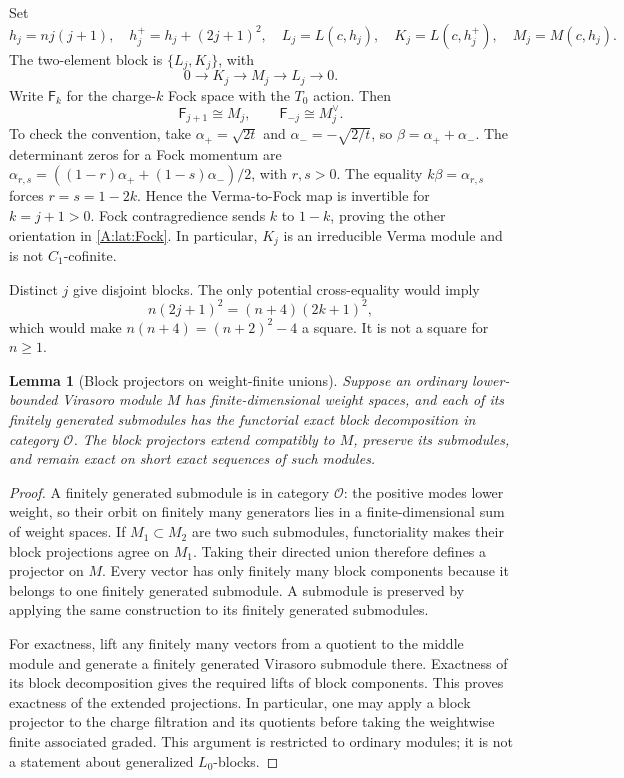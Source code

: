 \documentclass[11pt]{article}
\newtheorem{lemma}[theorem]{Lemma}
\numberwithin{equation}{section}
\begin{document}
Set
\[
 h_j=nj(j+1),\quad h_j^+=h_j+(2j+1)^2,
 \quad L_j=L(c,h_j),\quad K_j=L(c,h_j^+),\quad M_j=M(c,h_j).
\]
The two-element block is $\{L_j,K_j\}$, with
\begin{equation}\label{A:lat:Verma}
 0\longrightarrow K_j\longrightarrow M_j\longrightarrow L_j\longrightarrow0.
\end{equation}
Write $\mathsf F_k$ for the charge-$k$ Fock space with the $T_0$ action. Then
\begin{equation}\label{A:lat:Fock}
 \mathsf F_{j+1}\cong M_j,\qquad \mathsf F_{-j}\cong M_j^\vee.
\end{equation}
To check the convention, take $\alpha_+=\sqrt{2t}$ and $\alpha_-=-\sqrt{2/t}$, so $\beta=\alpha_++\alpha_-$. The determinant zeros for a Fock momentum are
$\alpha_{r,s}=((1-r)\alpha_++(1-s)\alpha_-)/2$, with $r,s>0$.
The equality $k\beta=\alpha_{r,s}$ forces $r=s=1-2k$. Hence the Verma-to-Fock map is invertible for $k=j+1>0$. Fock contragredience sends $k$ to $1-k$, proving the other orientation in \eqref{A:lat:Fock}. In particular, $K_j$ is an irreducible Verma module and is not $C_1$-cofinite.

Distinct $j$ give disjoint blocks. The only potential cross-equality would imply
\[
 n(2j+1)^2=(n+4)(2k+1)^2,
\]
which would make $n(n+4)=(n+2)^2-4$ a square. It is not a square for $n\geq1$.


\begin{lemma}[Block projectors on weight-finite unions]\label{A:blocks:union}
Suppose an ordinary lower-bounded Virasoro module $M$ has finite-dimensional weight spaces, and each of its finitely generated submodules has the functorial exact block decomposition in category $\mathcal O$. The block projectors extend compatibly to $M$, preserve its submodules, and remain exact on short exact sequences of such modules.
\end{lemma}
\begin{proof}
A finitely generated submodule is in category $\mathcal O$: the positive modes lower weight, so their orbit on finitely many generators lies in a finite-dimensional sum of weight spaces. If $M_1\subset M_2$ are two such submodules, functoriality makes their block projections agree on $M_1$. Taking their directed union therefore defines a projector on $M$. Every vector has only finitely many block components because it belongs to one finitely generated submodule. A submodule is preserved by applying the same construction to its finitely generated submodules.

For exactness, lift any finitely many vectors from a quotient to the middle module and generate a finitely generated Virasoro submodule there. Exactness of its block decomposition gives the required lifts of block components. This proves exactness of the extended projections. In particular, one may apply a block projector to the charge filtration and its quotients before taking the weightwise finite associated graded. This argument is restricted to ordinary modules; it is not a statement about generalized $L_0$-blocks.
\end{proof}
\end{document}
